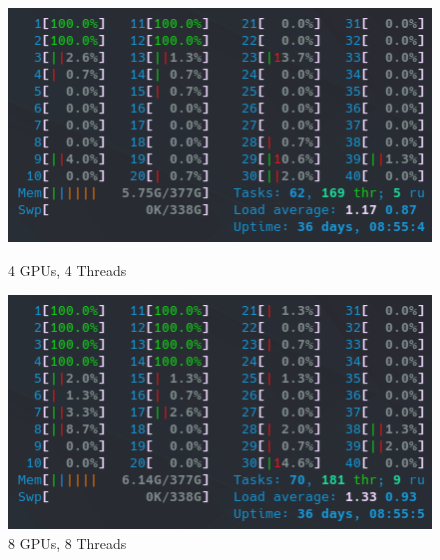 \begin{figure}[!h]
    \centering
    \captionsetup{width=.48\linewidth}
    \begin{minipage}[t]{0.48\textwidth}
        \includegraphics[width=\textwidth]{figures/configurations/OMP/htop_gpus/4GPUs_4Threads.png}
        \caption{4 GPUs, 4 Threads}\label{fig:4GPUs_4Threads}
    \end{minipage}
    \hspace{0.4cm}
    \centering
    \captionsetup{width=.48\linewidth}
    \begin{minipage}[t]{0.48\textwidth}
        \includegraphics[width=\textwidth]{figures/configurations/OMP/htop_gpus/8GPUs_8Threads.png}
        \caption{8 GPUs, 8 Threads}\label{fig:8GPUs_8Threads}
    \end{minipage}


\end{figure}
